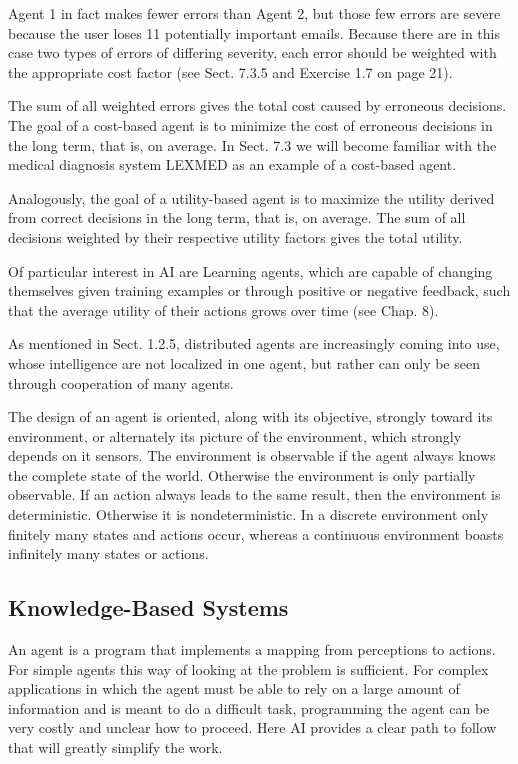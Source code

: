 \documentclass[10pt]{article}
\begin{document}
Agent 1 in fact makes fewer errors than Agent 2, but those few errors are severe because the user loses 11 potentially important emails. Because there are in this case two types of errors of differing severity, each error should be weighted with the appropriate cost factor (see Sect. 7.3.5 and Exercise 1.7 on page 21).

The sum of all weighted errors gives the total cost caused by erroneous decisions. The goal of a cost-based agent is to minimize the cost of erroneous decisions in the long term, that is, on average. In Sect. 7.3 we will become familiar with the medical diagnosis system LEXMED as an example of a cost-based agent.

Analogously, the goal of a utility-based agent is to maximize the utility derived from correct decisions in the long term, that is, on average. The sum of all decisions weighted by their respective utility factors gives the total utility.

Of particular interest in AI are Learning agents, which are capable of changing themselves given training examples or through positive or negative feedback, such that the average utility of their actions grows over time (see Chap. 8).

As mentioned in Sect. 1.2.5, distributed agents are increasingly coming into use, whose intelligence are not localized in one agent, but rather can only be seen through cooperation of many agents.

The design of an agent is oriented, along with its objective, strongly toward its environment, or alternately its picture of the environment, which strongly depends on it sensors. The environment is observable if the agent always knows the complete state of the world. Otherwise the environment is only partially observable. If an action always leads to the same result, then the environment is deterministic. Otherwise it is nondeterministic. In a discrete environment only finitely many states and actions occur, whereas a continuous environment boasts infinitely many states or actions.

\subsection*{Knowledge-Based Systems}
An agent is a program that implements a mapping from perceptions to actions. For simple agents this way of looking at the problem is sufficient. For complex applications in which the agent must be able to rely on a large amount of information and is meant to do a difficult task, programming the agent can be very costly and unclear how to proceed. Here AI provides a clear path to follow that will greatly simplify the work.
\end{document}
